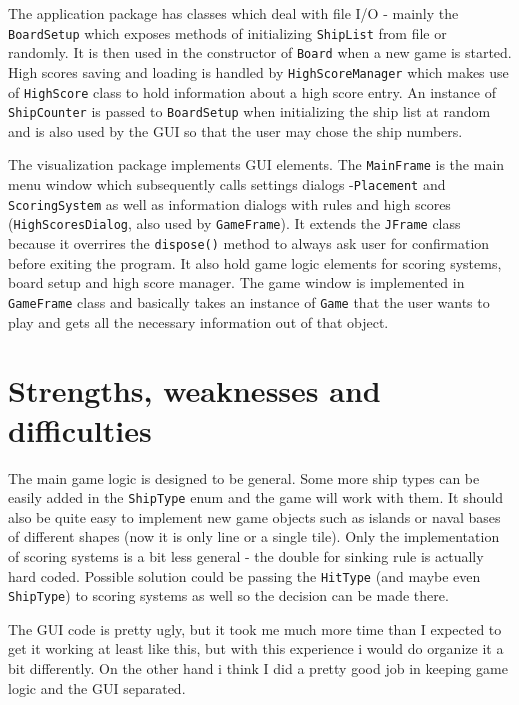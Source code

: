 \documentclass[]{article}
\begin{document}
The application package has classes which deal with file I/O - mainly the \texttt{BoardSetup} which exposes methods of initializing \texttt{ShipList} from file or randomly. It is then used in the constructor of \texttt{Board} when a new game is started. High scores saving and loading is handled by \texttt{HighScoreManager} which makes use of \texttt{HighScore} class to hold information about a high score entry. An instance of \texttt{ShipCounter} is passed to \texttt{BoardSetup} when initializing the ship list at random and is also used by the GUI so that the user may chose the ship numbers.

The visualization package implements GUI elements. The \texttt{MainFrame} is the main menu window which subsequently calls settings dialogs -\texttt{Placement} and \texttt{ScoringSystem} as well as information dialogs with rules and high scores (\texttt{HighScoresDialog}, also used by \texttt{GameFrame}). It extends the \texttt{JFrame} class because it overrires the \texttt{dispose()} method to always ask user for confirmation before exiting the program. It also hold game logic elements for scoring systems, board setup and high score manager. The game window is implemented in \texttt{GameFrame} class and basically takes an instance of \texttt{Game} that the user wants to play and gets all the necessary information out of that object.


\section{Strengths, weaknesses and difficulties}

The main game logic is designed to be general. Some more ship types can be easily added in the \texttt{ShipType} enum and the game will work with them. It should also be quite easy to implement new game objects such as islands or naval bases of different shapes (now it is only line or a single tile). Only the implementation of scoring systems is a bit less general - the double for sinking rule is actually hard coded. Possible solution could be passing the \texttt{HitType} (and maybe even \texttt{ShipType}) to scoring systems as well so the decision can be made there.

The GUI code is pretty ugly, but it took me much more time than I expected to get it working at least like this, but with this experience i would do organize it a bit differently. On the other hand i think I did a pretty good job in keeping game logic and the GUI separated. 
\end{document}
